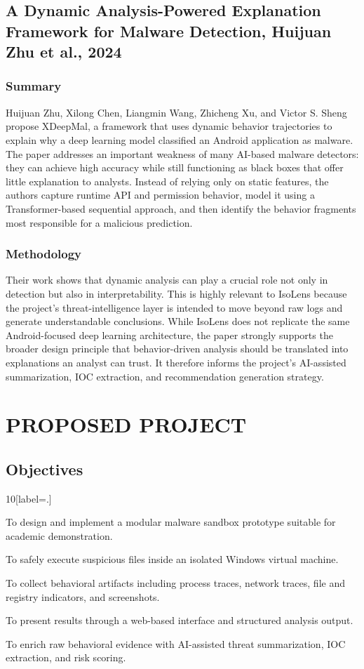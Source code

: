 \documentclass[a4paper,12pt,oneside]{report}
\begin{document}
\section{A Dynamic Analysis-Powered Explanation Framework for Malware Detection, Huijuan Zhu et al., 2024}

\subsection{Summary}
Huijuan Zhu, Xilong Chen, Liangmin Wang, Zhicheng Xu, and Victor S. Sheng~\cite{zhu2024} propose XDeepMal, a framework that uses dynamic behavior trajectories to explain why a deep learning model classified an Android application as malware. The paper addresses an important weakness of many AI-based malware detectors: they can achieve high accuracy while still functioning as black boxes that offer little explanation to analysts. Instead of relying only on static features, the authors capture runtime API and permission behavior, model it using a Transformer-based sequential approach, and then identify the behavior fragments most responsible for a malicious prediction.

\subsection{Methodology}
Their work shows that dynamic analysis can play a crucial role not only in detection but also in interpretability. This is highly relevant to IsoLens because the project’s threat-intelligence layer is intended to move beyond raw logs and generate understandable conclusions. While IsoLens does not replicate the same Android-focused deep learning architecture, the paper strongly supports the broader design principle that behavior-driven analysis should be translated into explanations an analyst can trust. It therefore informs the project’s AI-assisted summarization, IOC extraction, and recommendation generation strategy.



\chapter{PROPOSED PROJECT}
\section{Objectives}
\begin{thebibliography}{10}[label=\arabic*.]
\item To design and implement a modular malware sandbox prototype suitable for academic demonstration.
\item To safely execute suspicious files inside an isolated Windows virtual machine.
\item To collect behavioral artifacts including process traces, network traces, file and registry indicators, and screenshots.
\item To present results through a web-based interface and structured analysis output.
\item To enrich raw behavioral evidence with AI-assisted threat summarization, IOC extraction, and risk scoring.
\end{thebibliography}
\end{document}
